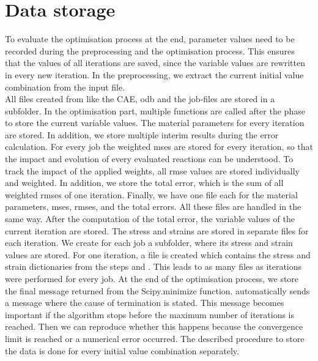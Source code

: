 \section{Data storage} \label{sec: dataStorage}

To evaluate the optimisation process at the end, parameter values need to be recorded during the preprocessing and the optimisation process.
This ensures that the values of all iterations are saved, since the variable values are rewritten in every new iteration.
In the preprocessing, we extract the current initial value combination from the input file. \\
\indent All files created from  like the CAE, \acrshort{odb} and the job-files are stored in a subfolder.
In the optimisation part, multiple functions are called after the phase  to store the current variable values. The material parameters for every iteration are stored. In addition, we store multiple interim results during the error calculation. For every job the weighted \acrshort{mse}s are stored for every iteration, so that the impact and evolution of every evaluated reactions can be understood. To track the impact of the applied weights, all \acrshort{rmse} values are stored individually and weighted. In addition, we store the total error, which is the sum of all weighted \acrshort{rmse}s of one iteration. Finally, we have one file each for the material parameters, \acrshort{mse}s, \acrshort{rmse}s, and the total errors. All these files are handled in the same way. After the computation of the total error, the variable values of the current iteration are stored. The stress and strains are stored in separate files for each iteration. We create for each job a subfolder, where its stress and strain values are stored. For one iteration, a file is created which contains the stress and strain dictionaries from the steps  and . This leads to as many files as iterations were performed for every job. At the end of the optimisation process, we store the final message returned from the Scipy.minimize function.  automatically sends a message where the cause of termination is stated. This message becomes important if the algorithm stops before the maximum number of iterations is reached. Then we can reproduce whether this happens because the convergence limit is reached or a numerical error occurred. The described procedure to store the data is done for every initial value combination separately.

